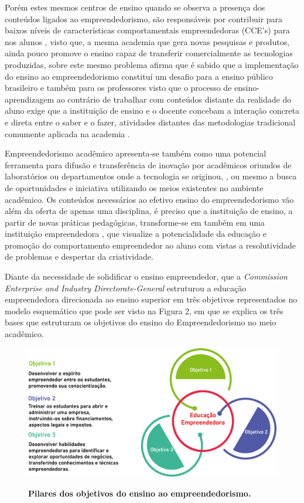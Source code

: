 Porém estes mesmos centros de ensino quando se observa a presença dos conteúdos ligados ao empreendedorismo, são responsáveis por contribuir para baixos níveis de características comportamentais empreendedoras (CCE’s) para nos alunos \cite{minello_caracteristicas_2017}, visto que, a mesma academia que gera novas pesquisas e produtos, ainda pouco promove o ensino capaz de transferir comercialmente as  tecnologias produzidas, sobre este mesmo problema  afirma que é sabido que a implementação do ensino ao empreendedorismo constituí um desafio para a ensino público brasileiro e também para os professores visto que o processo de ensino-aprendizagem ao contrário de trabalhar com conteúdos distante da realidade do aluno exige que a instituição de ensino e o docente concebam a interação concreta e direta entre o saber e o fazer, atividades distantes das metodologias tradicional comumente aplicada na academia \cite{saviani_historia_2019}. 

Empreendedorismo acadêmico apresenta-se também como uma potencial ferramenta para difusão e transferência de inovação por acadêmicos oriundos de laboratórios ou departamentos onde a tecnologia se originou, \cite{guo_what_2019, abreu_nature_2013}, ou mesmo a busca de oportunidades e iniciativa utilizando os meios existentes no ambiente acadêmico. Os conteúdos necessários ao efetivo ensino do empreendedorismo vão além da oferta de apenas uma disciplina, é preciso que a instituição de ensino, a partir de novas práticas pedagógicas, transforme-se em também em uma instituição empreendedora \cite{campelli_empreendedorismo_2011}, que visualize a potencialidade da educação e promoção do comportamento empreendedor ao aluno com vistas a resolutividade de problemas \cite{degen_o_1989} e despertar da criatividade.

Diante da necessidade de solidificar o ensino empreendedor, que a \textit{Commission Enterprise and Industry Directorate-General} \cite{european_commission_best_2008} estruturou a educação empreendedora direcionada ao ensino superior em três objetivos representados no modelo esquemático que pode ser visto na Figura 2, em que se explica os três bases que estruturam os objetivos do ensino do Empreendedorismo no meio acadêmico. 

\begin{figure}[H!]
\centering
\caption{\textbf{Pilares dos objetivos do ensino ao empreendedorismo.}}
\includegraphics[scale=0.05]{Imagens/figura2.png}
\label{figura_2}
\end{figure}


